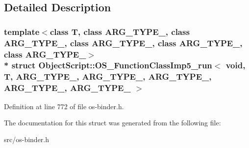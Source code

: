 \subsection{Detailed Description}
\subsubsection*{template$<$class T, class A\+R\+G\+\_\+\+T\+Y\+P\+E\+\_, class A\+R\+G\+\_\+\+T\+Y\+P\+E\+\_, class A\+R\+G\+\_\+\+T\+Y\+P\+E\+\_, class A\+R\+G\+\_\+\+T\+Y\+P\+E\+\_, class A\+R\+G\+\_\+\+T\+Y\+P\+E\+\_$>$\\*
struct Object\+Script\+::\+O\+S\+\_\+\+Function\+Class\+Imp5\+\_\+run$<$ void, T,   A\+R\+G\+\_\+\+T\+Y\+P\+E\+\_, A\+R\+G\+\_\+\+T\+Y\+P\+E\+\_, A\+R\+G\+\_\+\+T\+Y\+P\+E\+\_, A\+R\+G\+\_\+\+T\+Y\+P\+E\+\_, A\+R\+G\+\_\+\+T\+Y\+P\+E\+\_ $>$}



Definition at line 772 of file os-\/binder.\+h.



The documentation for this struct was generated from the following file\+:\begin{DoxyCompactItemize}
\item 
src/os-\/binder.\+h\end{DoxyCompactItemize}
